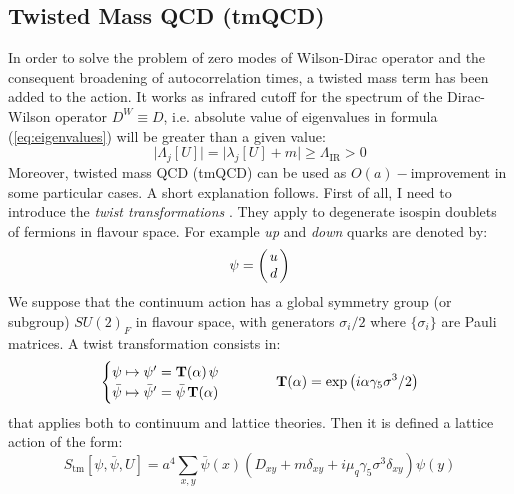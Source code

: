 \documentclass[english, LaM, oneside, noexaminfo]{sapthesis}
\begin{document}
\subsection{Twisted Mass QCD (tmQCD)}\label{sec:tmLQCD}
\noindent
In order to solve the problem of zero modes of Wilson-Dirac operator and the consequent broadening of autocorrelation times, a twisted mass term has been added to the action.
It works as infrared cutoff for the spectrum of the Dirac-Wilson operator $D^W \equiv D$, i.e. absolute value of eigenvalues in formula (\ref{eq:eigenvalues}) will be greater than a given value:
$$\Big| \Lambda_j [U] \Big| = \Big| \lambda_j[U]+m \Big| \ge \Lambda_\text{IR} > 0 $$
Moreover, twisted mass QCD (tmQCD) can be used as $O(a)-$improvement in some particular cases.
A short explanation follows.
\newline
First of all, I need to introduce the \textit{twist transformations} \cite{tmLQCD}.
They apply to degenerate isospin doublets of fermions in flavour space.
For example \textit{up} and \textit{down} quarks are denoted by:
\begin{equation*}
    \psi =
    \begin{pmatrix}
        \hspace*{0.5mm}u\hspace*{0.5mm} \\ \hspace*{0.5mm}d\hspace*{0.5mm}
    \end{pmatrix}
\end{equation*}
We suppose that the continuum action has a global symmetry group (or subgroup) $SU(2)_F$ in flavour space, with generators $\sigma_i/2$ where $\{\sigma_i\}$ are Pauli matrices.
A twist transformation consists in:
\begin{equation}\label{eq:twist}
    \begin{cases}
        \psi \mapsto \psi' = \mathbf{T}(\alpha) \hspace*{0.5mm} \psi \\
        \bar \psi \mapsto \bar \psi' = \bar \psi \hspace*{0.5mm} \mathbf{T}(\alpha) 
    \end{cases}
    \hspace*{1cm}
    \mathbf{T}(\alpha) = \text{exp}\left(i\alpha \gamma_5 \sigma^3/2\right)
\end{equation}
that applies both to continuum and lattice theories.
Then it is defined a lattice action of the form:
\begin{equation}\label{eq:tmQCD-action}
    S_\text{tm}[\psi,\bar \psi, U] = a^4 \sum_{x,y} \bar \psi(x) \left( D_{xy} + m \delta_{xy} + i \mu_q \gamma_5 \sigma^3 \delta_{xy} \right) \psi (y)
\end{equation}
\end{document}
